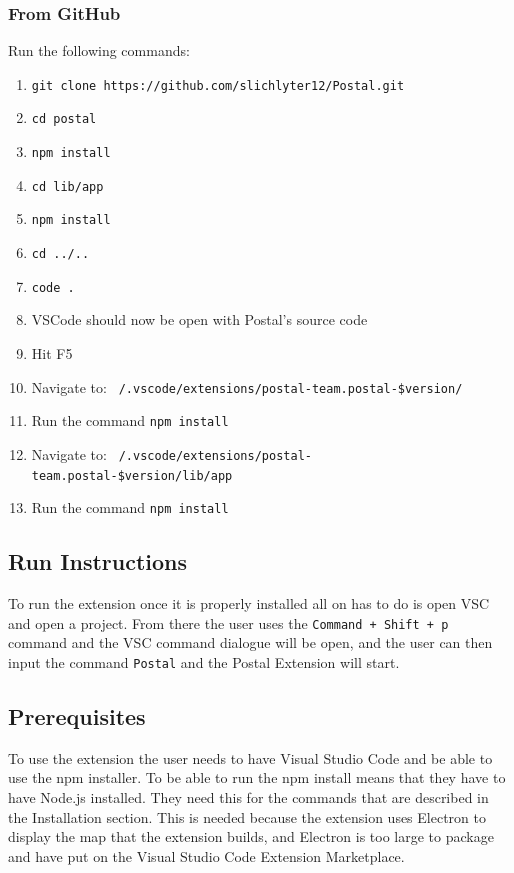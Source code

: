 \documentclass[letterpaper,10pt,titlepage,draftclsnofoot,onecolumn,onesided] {IEEEtran}
\begin{document}
\subsubsection{From GitHub} Run the following commands:
\begin{enumerate}
	\item 	\texttt{git clone https://github.com/slichlyter12/Postal.git}
	\item 	\texttt{cd postal}
	\item 	\texttt{npm install}
	\item 	\texttt{cd lib/app}
	\item 	\texttt{npm install}
	\item 	\texttt{cd ../..}
	\item 	\texttt{code .}
	\item 	VSCode should now be open with Postal's source code
	\item 	Hit F5
	\item 	Navigate to: \texttt{~/.vscode/extensions/postal-team.postal-\$version/}
	\item 	Run the command \texttt{npm install}
	\item 	Navigate to: \texttt{~/.vscode/extensions/postal-team.postal-\$version/lib/app}
	\item 	Run the command \texttt{npm install}
\end{enumerate}

\subsection{Run Instructions}

To run the extension once it is properly installed all on has to do is open VSC and open a project. 
From there the user uses the \texttt{Command + Shift + p} command and the VSC command dialogue will be open, and the user can then input the command \texttt{Postal} and the Postal Extension will start.

\subsection{Prerequisites}

To use the extension the user needs to have Visual Studio Code and be able to use the npm installer.
To be able to run the npm install means that they have to have Node.js installed. 
They need this for the commands that are described in the Installation section.
This is needed because the extension uses Electron to display the map that the extension builds, and Electron is too large to package and have put on the Visual Studio Code Extension Marketplace.
\end{document}
